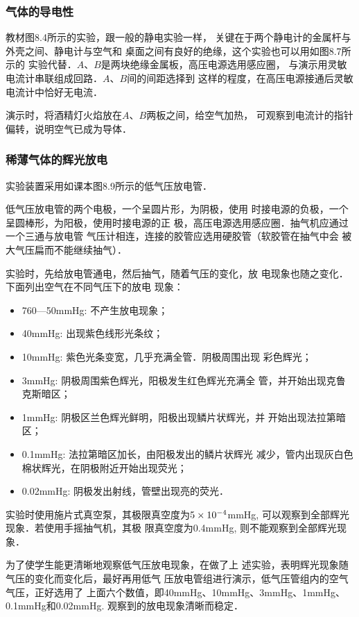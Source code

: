 \subsubsection{气体的导电性}
教材图8.4所示的实验，跟一般的静电实验一样，
关键在于两个静电计的金属杆与外壳之间、静电计与空气和
桌面之间有良好的绝缘，这个实验也可以用如图8.7所示的
实验代替．$A$、$B$是两块绝缘金属板，高压电源选用感应圈，
与演示用灵敏电流计串联组成回路．$A$、$B$间的间距选择到
这样的程度，在高压电源接通后灵敏电流计中恰好无电流．

演示时，将酒精灯火焰放在$A$、$B$两板之间，给空气加热，
可观察到电流计的指针偏转，说明空气已成为导体．

\subsubsection{稀薄气体的辉光放电}
实验装置采用如课本图8.9所示的低气压放电管．

低气压放电管的两个电极，一个呈圆片形，为阴极，使用
时接电源的负极，一个呈圆棒形，为阳极，使用时接电源的正
极，高压电源选用感应圈．抽气机应通过一个三通与放电管
气压计相连，连接的胶管应选用硬胶管（软胶管在抽气中会
被大气压扁而不能继续抽气）．

实验时，先给放电管通电，然后抽气，随着气压的变化，放
电现象也随之变化．下面列出空气在不同气压下的放电
现象：
\begin{itemize}
\item 760—50mmHg: 不产生放电现象；
\item 40mmHg: 出现紫色线形光条纹；
\item 10mmHg: 紫色光条变宽，几乎充满全管．阴极周围出现
彩色辉光；
\item 3mmHg: 阴极周围紫色辉光，阳极发生红色辉光充满全
管，并开始出现克鲁克斯暗区；
\item 1mmHg: 阴极区兰色辉光鲜明，阳极出现鳞片状辉光，并
开始出现法拉第暗区；
\item 0.1mmHg: 法拉第暗区加长，由阳极发出的鳞片状辉光
减少，管内出现灰白色棉状辉光，在阴极附近开始出现荧光；
\item 0.02mmHg: 阴极发出射线，管壁出现亮的荧光．
\end{itemize}

实验时使用施片式真空泵，其极限真空度为$5\times10^{-4}$mmHg, 可以观察到全部辉光现象．若使用手摇抽气机，其极
限真空度为0.4mmHg, 则不能观察到全部辉光现象．

为了使学生能更清晰地观察低气压放电现象，在做了上
述实验，表明辉光现象随气压的变化而变化后，最好再用低气
压放电管组进行演示，低气压管组内的空气气压，正好选用了
上面六个数值，即40mmHg、10mmHg、3mmHg、1mmHg、
0.1mmHg和0.02mmHg. 观察到的放电现象清晰而稳定．

